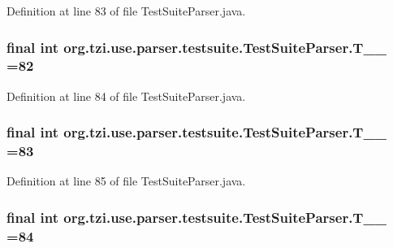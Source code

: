 Definition at line 83 of file Test\-Suite\-Parser.\-java.

\hypertarget{classorg_1_1tzi_1_1use_1_1parser_1_1testsuite_1_1_test_suite_parser_ae2198bbe161bbe20001afe60d39871ca}{
\subsubsection[{T\-\_\-\-\_\-82}]{\setlength{\rightskip}{0pt plus 5cm}final int org.\-tzi.\-use.\-parser.\-testsuite.\-Test\-Suite\-Parser.\-T\-\_\-\-\_ =82\hspace{0.3cm}{\ttfamily [static]}}}\label{classorg_1_1tzi_1_1use_1_1parser_1_1testsuite_1_1_test_suite_parser_ae2198bbe161bbe20001afe60d39871ca}


Definition at line 84 of file Test\-Suite\-Parser.\-java.

\hypertarget{classorg_1_1tzi_1_1use_1_1parser_1_1testsuite_1_1_test_suite_parser_a24d48d898f22913a5c38089e93035163}{
\subsubsection[{T\-\_\-\-\_\-83}]{\setlength{\rightskip}{0pt plus 5cm}final int org.\-tzi.\-use.\-parser.\-testsuite.\-Test\-Suite\-Parser.\-T\-\_\-\-\_ =83\hspace{0.3cm}{\ttfamily [static]}}}\label{classorg_1_1tzi_1_1use_1_1parser_1_1testsuite_1_1_test_suite_parser_a24d48d898f22913a5c38089e93035163}


Definition at line 85 of file Test\-Suite\-Parser.\-java.

\hypertarget{classorg_1_1tzi_1_1use_1_1parser_1_1testsuite_1_1_test_suite_parser_aea55aa1f808786166a6e91a17d7239c2}{
\subsubsection[{T\-\_\-\-\_\-84}]{\setlength{\rightskip}{0pt plus 5cm}final int org.\-tzi.\-use.\-parser.\-testsuite.\-Test\-Suite\-Parser.\-T\-\_\-\-\_ =84\hspace{0.3cm}{\ttfamily [static]}}}\label{classorg_1_1tzi_1_1use_1_1parser_1_1testsuite_1_1_test_suite_parser_aea55aa1f808786166a6e91a17d7239c2}


